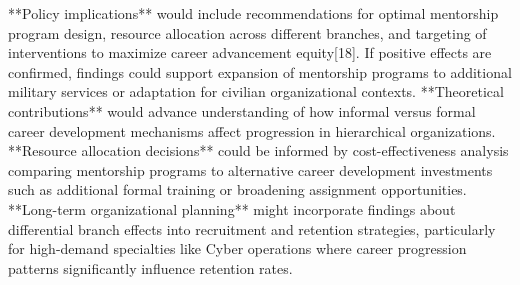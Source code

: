 \documentclass[main.tex]{subfiles}
\begin{document}

**Policy implications** would include recommendations for optimal mentorship program design, resource allocation across different branches, and targeting of interventions to maximize career advancement equity[18]. If positive effects are confirmed, findings could support expansion of mentorship programs to additional military services or adaptation for civilian organizational contexts. **Theoretical contributions** would advance understanding of how informal versus formal career development mechanisms affect progression in hierarchical organizations. **Resource allocation decisions** could be informed by cost-effectiveness analysis comparing mentorship programs to alternative career development investments such as additional formal training or broadening assignment opportunities. **Long-term organizational planning** might incorporate findings about differential branch effects into recruitment and retention strategies, particularly for high-demand specialties like Cyber operations where career progression patterns significantly influence retention rates.
\end{document}
